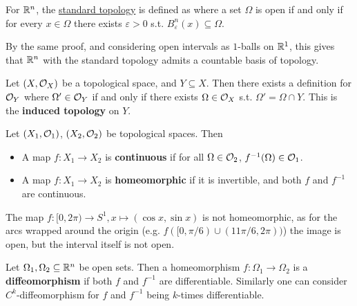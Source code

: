 \documentclass{article}
\begin{document}
\begin{remark}
    For $\mathbb{R}^n$, the \underline{standard topology} is defined as where a set $\Omega$ is open if and only if for every $x \in \Omega$ there exists $\varepsilon > 0$ s.t. $B_{\varepsilon}^n (x) \subseteq \Omega$. 
\end{remark}

\begin{corollary}\label{cor: R^n countable basis}
    By the same proof, and considering open intervals as $1$-balls on $\mathbb{R}^1$, this gives that $\mathbb{R}^n$ with the standard topology admits a countable basis of topology. 
\end{corollary}

\begin{definition}
    Let $(X, \mathcal{O}_X)$ be a topological space, and $Y \subseteq X$. Then there exists a definition for $\mathcal{O}_Y$ where $\Omega' \in \mathcal{O}_Y$ if and only if there exists $\Omega \in \mathcal{O}_X$ s.t. $\Omega' = \Omega \cap Y$. This is the \textbf{induced topology} on $Y$.
\end{definition}

\begin{definition}
    Let $(X_1, \mathcal{O}_1)$, $(X_2, \mathcal{O}_2)$ be topological spaces. Then
    \begin{itemize}
        \item A map $f: X_1 \to X_2$ is \textbf{continuous} if for all $\Omega \in \mathcal{O}_2$, $f^{-1}(\Omega) \in \mathcal{O}_1$. 
        \item A map $f: X_1 \to X_2$ is \textbf{homeomorphic} if it is invertible, and both $f$ and $f^{-1}$ are continuous. 
    \end{itemize}
\end{definition}

\begin{example}
    The map $f: [0, 2\pi) \to S^1, x \mapsto (\cos x, \sin x)$ is not homeomorphic, as for the arcs wrapped around the origin (e.g. $f([0, \pi/6) \cup (11\pi/6, 2\pi))$) the image is open, but the interval itself is not open.
\end{example}

\begin{definition}[Diffeomorphism]
    Let $\Omega_1, \Omega_2 \subseteq \mathbb{R}^n$ be open sets. Then a homeomorphism $f: \Omega_1 \to \Omega_2$ is a \textbf{diffeomorphism} if both $f$ and $f^{-1}$ are differentiable. Similarly one can consider $C^k$-diffeomorphism for $f$ and $f^{-1}$ being $k$-times differentiable.
\end{definition}
\end{document}
